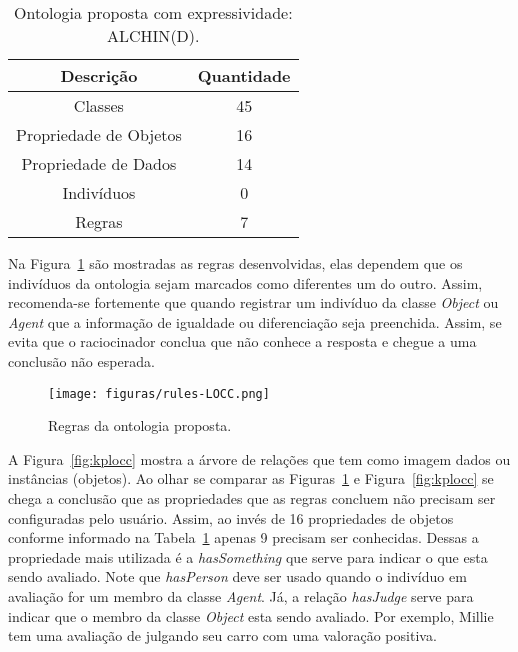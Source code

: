 \begin{table}
	\caption{Ontologia proposta com expressividade: ALCHIN(D).}
	\label{tab:oa:geral}
	\begin{center}
	\begin{tabular}{|c|c|}
		\hline
		Descrição & Quantidade \\ \hline
		Classes &  45 		\\ \hline
		Propriedade de Objetos & 16 \\ \hline
		Propriedade de Dados & 14 \\ \hline
		Indivíduos &  0		\\ \hline
		Regras & 7 \\ \hline
	\end{tabular}
	\end{center}
\end{table}

Na Figura~\ref{fig:rlocc} são mostradas as regras desenvolvidas, elas dependem
que os indivíduos da ontologia sejam marcados como diferentes um do outro.
Assim, recomenda-se fortemente que quando registrar um indivíduo da classe
\emph{Object} ou \emph{Agent} que a informação de igualdade ou diferenciação
seja preenchida\dev{}. Assim, se evita que o raciocinador conclua que não
conhece a resposta e chegue a uma conclusão não esperada.

\begin{figure}[t]
  \centering
  \texttt{[image: figuras/rules-LOCC.png]}
  \caption{Regras da ontologia proposta.}
  \label{fig:rlocc}
\end{figure}

A Figura~\ref{fig:kplocc} mostra a árvore de relações que tem como imagem
dados ou instâncias (objetos). Ao olhar se comparar as Figuras~\ref{fig:rlocc}
e Figura~\ref{fig:kplocc} se chega a conclusão que as propriedades que as
regras concluem não precisam ser configuradas pelo usuário. Assim, ao invés de
16 propriedades de objetos conforme informado na Tabela~\ref{tab:oa:geral}
apenas 9 precisam ser conhecidas. Dessas a propriedade mais utilizada é a
\emph{hasSomething} que serve para indicar o que esta sendo avaliado. Note que
\emph{hasPerson} deve ser usado quando o indivíduo em avaliação for um membro
da classe \emph{Agent}. Já, a relação \emph{hasJudge} serve para indicar que o
membro da classe \emph{Object} esta sendo avaliado. Por exemplo, Millie tem
uma avaliação de julgando seu carro com uma valoração positiva.

